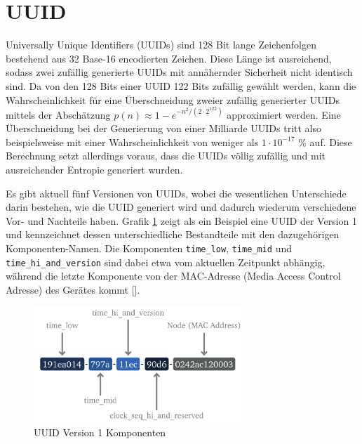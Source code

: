 \section{UUID}
\label{sec:uuid}

Universally Unique Identifiers (UUIDs) sind 128 Bit lange Zeichenfolgen bestehend aus 32 Base-16 encodierten Zeichen. Diese Länge ist ausreichend, sodass zwei zufällig generierte UUIDs mit annähernder Sicherheit nicht identisch sind. Da von den 128 Bits einer UUID 122 Bits zufällig gewählt werden, kann die Wahrscheinlichkeit für eine Überschneidung zweier zufällig generierter UUIDs mittels der Abschätzung $p(n) \approx 1 - e^{-n^2 / (2 \cdot 2^{122})}$ approximiert werden. Eine Überschneidung bei der Generierung von einer Milliarde UUIDs tritt also beispielsweise mit einer Wahrscheinlichkeit von weniger als $1 \cdot 10^{-17}$ \% auf. Diese Berechnung setzt allerdings voraus, dass die UUIDs völlig zufällig und mit ausreichender Entropie generiert wurden.

Es gibt aktuell fünf Versionen von UUIDs, wobei die wesentlichen Unterschiede darin bestehen, wie die UUID generiert wird und dadurch wiederum verschiedene Vor- und Nachteile haben. Grafik \ref{fig:UUIDv1} zeigt als ein Beispiel eine UUID der Version 1 und kennzeichnet dessen unterschiedliche Bestandteile mit den dazugehörigen Komponenten-Namen. Die Komponenten \verb|time_low|, \verb|time_mid| und \verb|time_hi_and_version| sind dabei etwa vom aktuellen Zeitpunkt abhängig, während die letzte Komponente von der MAC-Adresse (Media Access Control Adresse) des Gerätes kommt [\cite{uuid}].
%
\begin{figure}[htbp]
	\centering\includegraphics[width=0.7\textwidth]{images/03/UUID.pdf}
    \caption{UUID Version 1 Komponenten}
    \label{fig:UUIDv1}
\end{figure}

